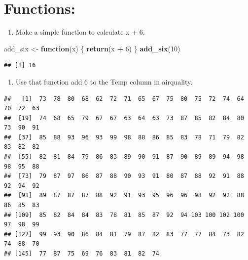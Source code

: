\documentclass[
]{article}
\newenvironment{Shaded}{\begin{snugshade}}{\end{snugshade}}
\newcommand{\ControlFlowTok}[1]{\textcolor[rgb]{0.13,0.29,0.53}{\textbf{#1}}}
\newcommand{\DecValTok}[1]{\textcolor[rgb]{0.00,0.00,0.81}{#1}}
\newcommand{\FunctionTok}[1]{\textcolor[rgb]{0.13,0.29,0.53}{\textbf{#1}}}
\newcommand{\NormalTok}[1]{#1}
\newcommand{\OtherTok}[1]{\textcolor[rgb]{0.56,0.35,0.01}{#1}}
\newcommand{\SpecialCharTok}[1]{\textcolor[rgb]{0.81,0.36,0.00}{\textbf{#1}}}
\providecommand{\tightlist}{%
  \setlength{\itemsep}{0pt}\setlength{\parskip}{0pt}}
\begin{document}
\section{Functions:}\label{functions}

\begin{enumerate}
\def\labelenumi{\arabic{enumi}.}
\setcounter{enumi}{23}
\tightlist
\item
  Make a simple function to calculate x + 6.
\end{enumerate}

\begin{Shaded}
\begin{Highlighting}[]
\NormalTok{add\_six }\OtherTok{\textless{}{-}} \ControlFlowTok{function}\NormalTok{(x) \{}
  \FunctionTok{return}\NormalTok{(x }\SpecialCharTok{+} \DecValTok{6}\NormalTok{)}
\NormalTok{\}}
\FunctionTok{add\_six}\NormalTok{(}\DecValTok{10}\NormalTok{)}
\end{Highlighting}
\end{Shaded}

\begin{verbatim}
## [1] 16
\end{verbatim}

\begin{enumerate}
\def\labelenumi{\arabic{enumi}.}
\setcounter{enumi}{24}
\tightlist
\item
  Use that function add 6 to the Temp column in airquality.
\end{enumerate}

\begin{Shaded}
\end{Shaded}

\begin{verbatim}
##   [1]  73  78  80  68  62  72  71  65  67  75  80  75  72  74  64  70  72  63
##  [19]  74  68  65  79  67  67  63  64  63  73  87  85  82  84  80  73  90  91
##  [37]  85  88  93  96  93  99  98  88  86  85  83  78  71  79  82  83  82  82
##  [55]  82  81  84  79  86  83  89  90  91  87  90  89  89  94  98  98  95  88
##  [73]  79  87  97  86  87  88  90  93  91  80  87  88  92  91  88  92  94  92
##  [91]  89  87  87  87  88  92  91  93  95  96  96  98  92  92  88  86  85  83
## [109]  85  82  84  84  83  78  81  85  87  92  94 103 100 102 100  97  98  99
## [127]  99  93  90  86  84  81  79  87  82  83  77  77  84  73  82  74  88  70
## [145]  77  87  75  69  76  83  81  82  74
\end{verbatim}
\end{document}
